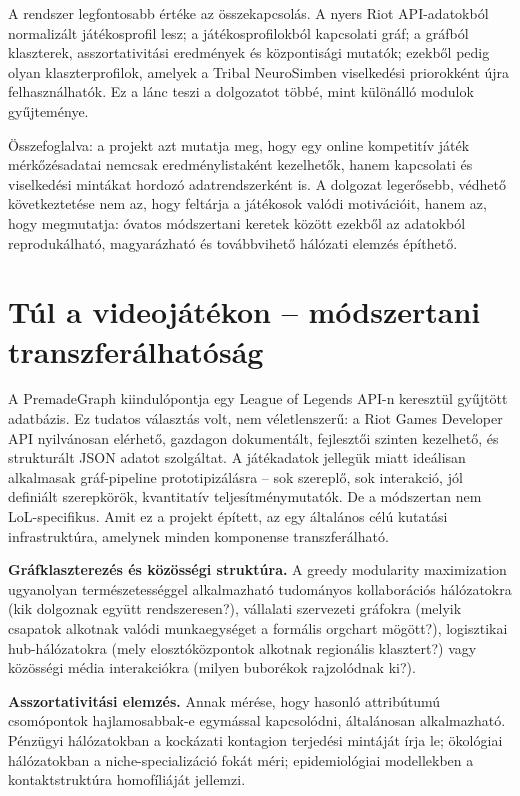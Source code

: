 ﻿\documentclass[a4paper,12pt]{report}
\begin{document}
A rendszer legfontosabb értéke az összekapcsolás. A nyers Riot API-adatokból normalizált játékosprofil
lesz; a játékosprofilokból kapcsolati gráf; a gráfból klaszterek, asszortativitási eredmények és
központisági mutatók; ezekből pedig olyan klaszterprofilok, amelyek a Tribal NeuroSimben
viselkedési priorokként újra felhasználhatók. Ez a lánc teszi a dolgozatot többé, mint különálló
modulok gyűjteménye.

Összefoglalva: a projekt azt mutatja meg, hogy egy online kompetitív játék mérkőzésadatai nemcsak
eredménylistaként kezelhetők, hanem kapcsolati és viselkedési mintákat hordozó adatrendszerként is.
A dolgozat legerősebb, védhető következtetése nem az, hogy feltárja a játékosok valódi motivációit,
hanem az, hogy megmutatja: óvatos módszertani keretek között ezekből az adatokból reprodukálható,
magyarázható és továbbvihető hálózati elemzés építhető.

\section{Túl a videojátékon -- módszertani transzferálhatóság}
\label{sec:osszegzes-transfer}

A PremadeGraph kiindulópontja egy League of Legends API-n keresztül gyűjtött adatbázis. Ez
tudatos választás volt, nem véletlenszerű: a Riot Games Developer API nyilvánosan elérhető,
gazdagon dokumentált, fejlesztői szinten kezelhető, és strukturált JSON adatot szolgáltat.
A játékadatok jellegük miatt ideálisan alkalmasak gráf-pipeline prototipizálásra -- sok szereplő,
sok interakció, jól definiált szerepkörök, kvantitatív teljesítménymutatók. De a módszertan
nem LoL-specifikus. Amit ez a projekt épített, az egy általános célú kutatási infrastruktúra,
amelynek minden komponense transzferálható.

\textbf{Gráfklaszterezés és közösségi struktúra.} A greedy modularity maximization ugyanolyan
természetességgel alkalmazható tudományos kollaborációs hálózatokra (kik dolgoznak együtt
rendszeresen?), vállalati szervezeti gráfokra (melyik csapatok alkotnak valódi munkaegységet
a formális orgchart mögött?), logisztikai hub-hálózatokra (mely elosztóközpontok alkotnak
regionális klasztert?) vagy közösségi média interakciókra (milyen buborékok rajzolódnak ki?).

\textbf{Asszortativitási elemzés.} Annak mérése, hogy hasonló attribútumú csomópontok
hajlamosabbak-e egymással kapcsolódni, általánosan alkalmazható. Pénzügyi hálózatokban
a kockázati kontagion terjedési mintáját írja le; ökológiai hálózatokban a niche-specializáció
fokát méri; epidemiológiai modellekben a kontaktstruktúra homofíliáját jellemzi.
\end{document}

